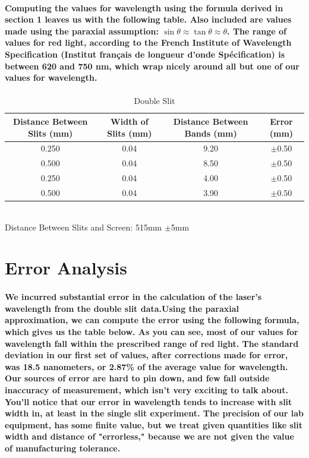 \documentclass[double]{amsart}
\begin{document}
{
\paragraph{Computing the values for wavelength using the formula derived in section 1 leaves us with the following table. Also included are values made using the paraxial assumption: $\sin\theta\approx\tan\theta\approx\theta$. The range of values for red light, according to the French Institute of Wavelength Specification (Institut fran\c{c}ais de longueur d'onde Sp\'{e}cification) is between 620 and 750 nm, which wrap nicely around all but one of our values for wavelength.}
\paragraph{}
\begin{table}[H]
\centering
\caption{Double Slit}
\label{my-label}
\begin{tabular}{c|c|c|c}
Distance Between Slits (mm) & Width of Slits (mm) & Distance Between Bands (mm) & Error (mm) \\ \hline
0.250            & 0.04             & 9.20             & $\pm$0.50       \\
0.500            & 0.04             & 8.50             & $\pm$0.50       \\
0.250            & 0.04             & 4.00             & $\pm$0.50       \\
0.500            & 0.04             & 3.90             & $\pm$0.50      
\end{tabular}
\\Distance Between Slits and Screen: 515mm $\pm$5mm
\end{table}

\section{Error Analysis}
\paragraph{We incurred substantial error in the calculation of the laser's wavelength from the double slit data.Using the paraxial approximation, we can compute the error using the following formula, which gives us the table below. As you can see, most of our values for wavelength fall within the prescribed range of red light. The standard deviation in our first set of values, after corrections made for error, was 18.5 nanometers, or 2.87\% of the average value for wavelength. Our sources of error are hard to pin down, and few fall outside inaccuracy of measurement, which isn't very exciting to talk about. You'll notice that our error in wavelength tends to increase with slit width in, at least in the single slit experiment. The precision of our lab equipment, has some finite value, but we treat given quantities like slit width and distance of "errorless," because we are not given the value of manufacturing tolerance.}
}
\end{document}
